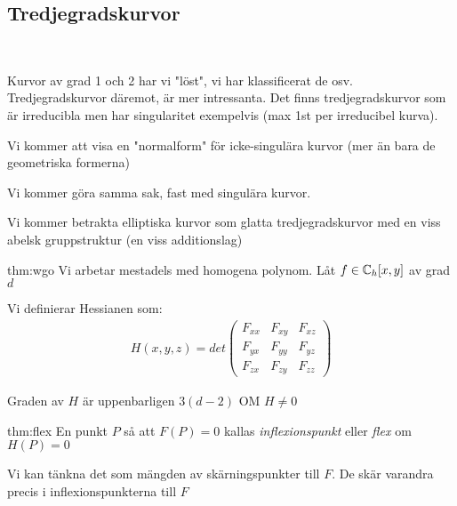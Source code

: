 \subsection{Tredjegradskurvor}\hfill\\\par
\noindent Kurvor av grad 1 och 2 har vi "löst", vi har klassificerat de osv. Tredjegradskurvor däremot, är mer intressanta. Det finns tredjegradskurvor som är irreducibla men har singularitet exempelvis (max 1st per irreducibel kurva).\par
\noindent Vi kommer att visa en "normalform" för icke-singulära kurvor (mer än bara de geometriska formerna)\par
\noindent Vi kommer göra samma sak, fast med singulära kurvor.\par
\noindent Vi kommer betrakta elliptiska kurvor som glatta tredjegradskurvor med en viss abelsk gruppstruktur (en viss additionslag)
\par\bigskip
\begin{theo}[Hessian]{thm:wgo}
  Vi arbetar mestadels med homogena polynom. Låt $f\in\mathbb{C}_h[x,y]$ av grad $d$\par
  \noindent Vi definierar Hessianen som:
  \begin{equation*}
    \begin{gathered}
      H(x,y,z) = det\begin{pmatrix}F_{xx}&F_{xy}&F_{xz}\\F_{yx}&F_{yy}&F_{yz}\\F_{zx}&F_{zy}&F_{zz}\end{pmatrix}
    \end{gathered}
  \end{equation*}\par
  \noindent Graden av $H$ är uppenbarligen $3(d-2)$ OM $H\neq0$
\end{theo}
\par\bigskip
\begin{theo}[Inflexionspunkt]{thm:flex}
  En punkt $P$ så att $F(P)=0$ kallas \textit{inflexionspunkt} eller \textit{flex} om $H(P)=0$\par
  \noindent Vi kan tänkna det som mängden av skärningspunkter till $F$. De skär varandra precis i inflexionspunkterna till $F$
\end{theo}
\newpage
